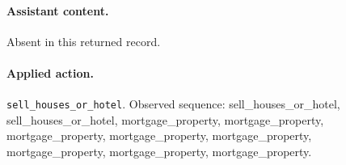 \paragraph{Assistant content.} Absent in this returned record.

\paragraph{Applied action.} \texttt{sell\_houses\_or\_hotel}. Observed sequence: sell\_houses\_or\_hotel, sell\_houses\_or\_hotel, mortgage\_property, mortgage\_property, mortgage\_property, mortgage\_property, mortgage\_property, mortgage\_property, mortgage\_property, mortgage\_property.
